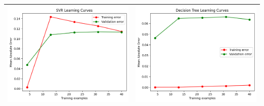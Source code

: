 \begin{table}[H]
    \centering
    \footnotesize
    \setlength\tabcolsep{0pt}
    \begin{tabularx}{\textwidth}{|X|X|}
        \hline
        \includegraphics[width=\linewidth, trim=0 0 0 0]{images/SVR_lc50_Azure.png} &
        \includegraphics[width=\linewidth, trim=0 0 0 0]{images/DecisionTree_lc50_Azure.png} \\
        \hline

\end{tabularx}
\end{table}
